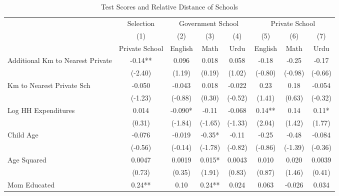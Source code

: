 \begin{sidewaystable}[htbp]\centering
\def\sym#1{\ifmmode^{#1}\else\(^{#1}\)\fi}
\caption{Test Scores and Relative Distance of Schools\label{distancescores}}
\begin{tabular}{l*{7}{c}}
\toprule
                &\multicolumn{1}{c}{Selection}&\multicolumn{3}{c}{Government School} &\multicolumn{3}{c}{Private School}    \\\cmidrule(lr){2-2}\cmidrule(lr){3-5}\cmidrule(lr){6-8}
                &\multicolumn{1}{c}{(1)}&\multicolumn{1}{c}{(2)}&\multicolumn{1}{c}{(3)}&\multicolumn{1}{c}{(4)}&\multicolumn{1}{c}{(5)}&\multicolumn{1}{c}{(6)}&\multicolumn{1}{c}{(7)}\\
                &\multicolumn{1}{c}{Private School}&\multicolumn{1}{c}{English}&\multicolumn{1}{c}{Math}&\multicolumn{1}{c}{Urdu}&\multicolumn{1}{c}{English}&\multicolumn{1}{c}{Math}&\multicolumn{1}{c}{Urdu}\\
\midrule
Additional Km to Nearest Private&    -0.14** &    0.096   &    0.018   &    0.058   &    -0.18   &    -0.25   &    -0.17   \\
                &  (-2.40)   &   (1.19)   &   (0.19)   &   (1.02)   &  (-0.80)   &  (-0.98)   &  (-0.66)   \\
Km to Nearest Private Sch&   -0.050   &   -0.043   &    0.018   &   -0.022   &     0.23   &     0.18   &   -0.054   \\
                &  (-1.23)   &  (-0.88)   &   (0.30)   &  (-0.52)   &   (1.41)   &   (0.63)   &  (-0.32)   \\
Log HH Expenditures&    0.014   &   -0.090*  &    -0.11   &   -0.068   &     0.14** &     0.14   &     0.11*  \\
                &   (0.31)   &  (-1.84)   &  (-1.65)   &  (-1.33)   &   (2.04)   &   (1.42)   &   (1.77)   \\
Child Age       &   -0.076   &   -0.019   &    -0.35*  &    -0.11   &    -0.25   &    -0.48   &   -0.084   \\
                &  (-0.56)   &  (-0.14)   &  (-1.78)   &  (-0.82)   &  (-0.86)   &  (-1.39)   &  (-0.36)   \\
Age Squared     &   0.0047   &   0.0019   &    0.015*  &   0.0043   &    0.010   &    0.020   &   0.0039   \\
                &   (0.73)   &   (0.35)   &   (1.91)   &   (0.83)   &   (0.87)   &   (1.46)   &   (0.41)   \\
Mom Educated    &     0.24** &     0.10   &     0.24** &    0.024   &    0.063   &   -0.026   &    0.034   \\

\end{tabular}
\end{sidewaystable}

